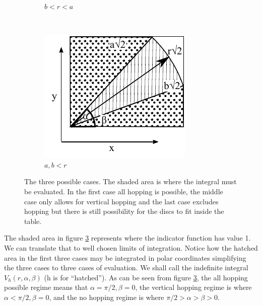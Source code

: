 \documentclass[superscriptaddress,pre,reprint,showpacs,onecolumn]{revtex4-1}
\begin{document}
\begin{figure}[h]
\begin{subfigure}[b]{0.32\textwidth}
          \caption{$b<r<a$}
          \label{Caso2}
        \end{subfigure}%
        ~ %
        \begin{subfigure}[b]{0.32\textwidth}
          \centering
          \includegraphics[width=\textwidth]{FigurasPerfectas/DiagramaIntegraCaso3.pdf}
          \caption{$a,b<r$}
          \label{Caso3}
        \end{subfigure}%
        \caption{The three possible cases. The shaded area is where the integral
          must be evaluated. In the first case all hopping is possible, the middle case
          only allows for vertical hopping and the last case excludes hopping but there
        is still possibility for the discs to fit inside the table.}
\label{CasosIntegra}
\end{figure}
The shaded area in figure \ref{CasosIntegra} represents where the indicator function
has value 1. We can translate that to well chosen limits of integration. Notice
how the hatched area in the first three cases may be integrated in polar coordinates
simplifying the three cases to three cases of evaluation. We shall call the
indefinite integral $V_h(r,\alpha,\beta)$ (h is for ``hatched'').
As can be seen from figure \ref{CasosIntegra}, the all hopping possible regime
means that $\alpha = \pi/2, \beta=0$, the vertical hopping regime is where
$\alpha < \pi/2, \beta=0$, and the no hopping regime is where $\pi/2 > \alpha > \beta > 0$.
\end{document}
